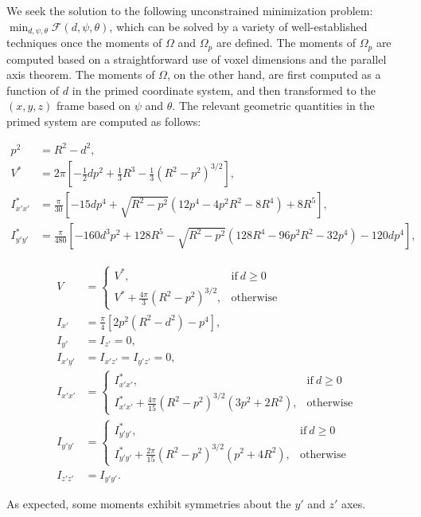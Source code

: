 We seek the solution to the following unconstrained minimization problem: $\displaystyle \min_{d, \psi, \theta} \mathcal{F}(d,\psi,\theta)$, which can be solved by a variety of well-established techniques once the moments of $\Omega$ and $\Omega_p$ are defined. The moments of $\Omega_p$ are computed based on a straightforward use of voxel dimensions and the parallel axis theorem. The moments of $\Omega$, on the other hand, are first computed as a function of $d$ in the primed coordinate system, and then transformed to the $(x, y, z)$ frame based on $\psi$ and $\theta$. The relevant geometric quantities in the primed system are computed as follows:
\begin{linenomath}\begin{align}
{p^2} &= R^2 - d^2, \\
V^* &= 2\pi\left[-\frac{1}{2}dp^2 + \frac{1}{3}R^3 - \frac{1}{3}(R^2 - p^2)^{3/2} \right], \\
I^*_{x'x'} &= \frac{\pi}{30}\left[-15dp^4 + \sqrt{R^2-p^2}\left(12p^4 - 4p^2R^2 - 8R^4\right) + 8R^5 \right], \\
I^*_{y'y'} &= \frac{\pi}{480}\left[-160d^3p^2 + 128R^5 - \sqrt{R^2-p^2}\left(128R^4 - 96p^2R^2 - 32p^4\right) - 120dp^4 \right],
\end{align}\end{linenomath}
\begin{linenomath}\begin{align} 
V &=  \begin{cases}
      V^*, & \text{if}\ d \geq 0 \\
      V^* + \frac{4\pi}{3}\left(R^2-p^2\right)^{3/2}, & \text{otherwise}
    \end{cases}\\
I_{x'} &= \frac{\pi}{4}\left[2p^2(R^2-d^2) - p^4 \right],\\
I_{y'} &= I_{z'} = 0, \\
I_{x'y'} &= I_{x'z'} = I_{y'z'} = 0, \\
I_{x'x'} &=  \begin{cases}
      I^*_{x'x'}, & \text{if}\ d \geq 0 \\
       I^*_{x'x'} + \frac{4\pi}{15}(R^2-p^2)^{3/2}(3p^2+2R^2), & \text{otherwise}
    \end{cases} \\
I_{y'y'} &=  \begin{cases}
     I^*_{y'y'}, & \text{if}\ d \geq 0 \\
     I^*_{y'y'} + \frac{2\pi}{15}(R^2-p^2)^{3/2}(p^2+4R^2), & \text{otherwise}
    \end{cases} \\
I_{z'z'} &= I_{y'y'}.
\end{align}\end{linenomath}
As expected, some moments exhibit symmetries about the $y'$ and $z'$ axes.

